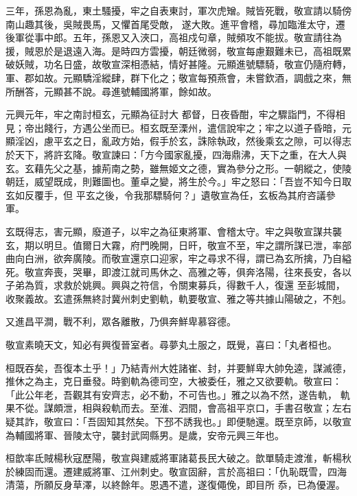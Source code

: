 \begin{pinyinscope}
 三年，孫恩為亂，東土騷擾，牢之自表東討，軍次虎矰。賊皆死戰，敬宣請以騎傍南山趣其後，吳賊畏馬，又懼首尾受敵，
 遂大敗。進平會稽，尋加臨淮太守，遷後軍從事中郎。五年，孫恩又入浹口，高祖戍句章，賊頻攻不能拔。敬宣請往為援，賊恩於是退遠入海。是時四方雲擾，朝廷微弱，敬宣每慮艱難未已，高祖既累破妖賊，功名日盛，故敬宣深相憑結，情好甚隆。元顯進號驃騎，敬宣仍隨府轉，軍、郡如故。元顯驕淫縱肆，群下化之；敬宣每預燕會，未嘗欽酒，調戲之來，無所酬答，元顯甚不說。尋進號輔國將軍，餘如故。



 元興元年，牢之南討桓玄，元顯為征討大
 都督，日夜昏酣，牢之驟詣門，不得相見；帝出餞行，方遇公坐而已。桓玄既至溧州，遣信說牢之；牢之以道子昏暗，元顯淫凶，慮平玄之日，亂政方始，假手於玄，誅除執政，然後乘玄之隙，可以得志於天下，將許玄降。敬宣諫曰：「方今國家亂擾，四海鼎沸，天下之重，在大人與玄。玄藉先父之基，據荊南之勢，雖無姬文之德，實為參分之形。一朝縱之，使陵朝廷，威望既成，則難圖也。董卓之變，將生於今。」牢之怒曰：「吾豈不知今日取玄如反覆手，但
 平玄之後，令我那驃騎何？」遺敬宣為任，玄板為其府咨議參軍。



 玄既得志，害元顯，廢道子，以牢之為征東將軍、會稽太守。牢之與敬宣謀共襲玄，期以明旦。值爾日大霧，府門晚開，日旰，敬宣不至，牢之謂所謀已泄，率部曲向白洲，欲奔廣陵。而敬宣還京口迎家，牢之尋求不得，謂已為玄所擒，乃自縊死。敬宣奔喪，哭畢，即渡江就司馬休之、高雅之等，俱奔洛陽，往來長安，各以子弟為質，求救於姚興。興與之符信，令關東募兵，得數千人，復還
 至彭城間，收聚義故。玄遣孫無終討冀州刺史劉軌，軌要敬宣、雅之等共據山陽破之，不剋。



 又進昌平澗，戰不利，眾各離散，乃俱奔鮮卑慕容德。



 敬宣素曉天文，知必有興復晉室者。尋夢丸土服之，既覺，喜曰：「丸者桓也。



 桓既吞矣，吾復本土乎！」乃結青州大姓諸崔、封，并要鮮卑大帥免逵，謀滅德，推休之為主，克日垂發。時劉軌為德司空，大被委任，雅之又欲要軌。敬宣曰：「此公年老，吾觀其有安齊志，必不動，不可告也。」雅之以為不然，遂告軌，
 軌果不從。謀頗泄，相與殺軌而去。至淮、泗間，會高祖平京口，手書召敬宣；左右疑其詐，敬宣曰：「吾固知其然矣。下邳不誘我也。」即便馳還。既至京師，以敬宣為輔國將軍、晉陵太守，襲封武岡縣男。是歲，安帝元興三年也。



 桓歆率氐賊楊秋寇歷陽，敬宣與建威將軍諸葛長民大破之。歆單騎走渡淮，斬楊秋於練固而還。遷建威將軍、江州刺史。敬宣固辭，言於高祖曰：「仇恥既雪，四海清蕩，所願反身草澤，以終餘年。恩遇不遣，遂復僶俛，即目所
 忝，已為優渥。




\end{pinyinscope}
